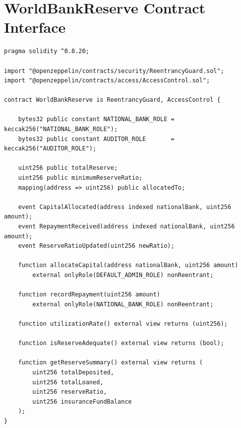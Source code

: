 \section{WorldBankReserve Contract Interface}
\label{app:worldbank-reserve-interface}


\begin{lstlisting}[language=Solidity,basicstyle=\ttfamily\scriptsize,breaklines=true,
    commentstyle=\color{GrayText},keywordstyle=\color{PrimaryBlue}\bfseries,
    frame=single,rulecolor=\color{AccentBlue!40},captionpos=b,
    caption={WorldBankReserve.sol -- Tier 1 public interface. Full implementation in project repository.}]
pragma solidity ^0.8.20;

import "@openzeppelin/contracts/security/ReentrancyGuard.sol";
import "@openzeppelin/contracts/access/AccessControl.sol";

contract WorldBankReserve is ReentrancyGuard, AccessControl {

    bytes32 public constant NATIONAL_BANK_ROLE = keccak256("NATIONAL_BANK_ROLE");
    bytes32 public constant AUDITOR_ROLE       = keccak256("AUDITOR_ROLE");

    uint256 public totalReserve;
    uint256 public minimumReserveRatio;
    mapping(address => uint256) public allocatedTo;

    event CapitalAllocated(address indexed nationalBank, uint256 amount);
    event RepaymentReceived(address indexed nationalBank, uint256 amount);
    event ReserveRatioUpdated(uint256 newRatio);

    function allocateCapital(address nationalBank, uint256 amount)
        external onlyRole(DEFAULT_ADMIN_ROLE) nonReentrant;

    function recordRepayment(uint256 amount)
        external onlyRole(NATIONAL_BANK_ROLE) nonReentrant;

    function utilizationRate() external view returns (uint256);

    function isReserveAdequate() external view returns (bool);

    function getReserveSummary() external view returns (
        uint256 totalDeposited,
        uint256 totalLoaned,
        uint256 reserveRatio,
        uint256 insuranceFundBalance
    );
}
\end{lstlisting}

